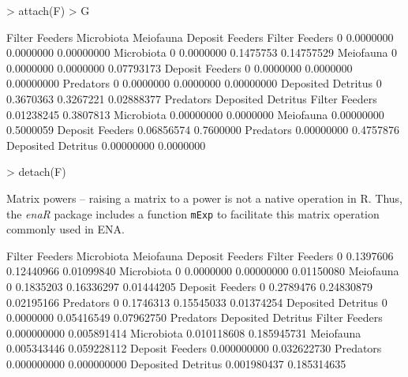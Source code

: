 \documentclass[article]{jss}
\begin{document}
\begin{Schunk}
\begin{Sinput}
> attach(F)
> G
\end{Sinput}
\begin{Soutput}
                   Filter Feeders Microbiota Meiofauna Deposit Feeders
Filter Feeders                  0  0.0000000 0.0000000      0.00000000
Microbiota                      0  0.0000000 0.1475753      0.14757529
Meiofauna                       0  0.0000000 0.0000000      0.07793173
Deposit Feeders                 0  0.0000000 0.0000000      0.00000000
Predators                       0  0.0000000 0.0000000      0.00000000
Deposited Detritus              0  0.3670363 0.3267221      0.02888377
                    Predators Deposited Detritus
Filter Feeders     0.01238245          0.3807813
Microbiota         0.00000000          0.0000000
Meiofauna          0.00000000          0.5000059
Deposit Feeders    0.06856574          0.7600000
Predators          0.00000000          0.4757876
Deposited Detritus 0.00000000          0.0000000
\end{Soutput}
\begin{Sinput}
> detach(F)
\end{Sinput}
\end{Schunk}

Matrix powers -- raising a matrix to a power is not a native operation
in R.  Thus, the \textit{enaR} package includes a function
\texttt{mExp} to facilitate this matrix operation commonly used in ENA.

\begin{Schunk}
\begin{Soutput}
                   Filter Feeders Microbiota  Meiofauna Deposit Feeders
Filter Feeders                  0  0.1397606 0.12440966      0.01099840
Microbiota                      0  0.0000000 0.00000000      0.01150080
Meiofauna                       0  0.1835203 0.16336297      0.01444205
Deposit Feeders                 0  0.2789476 0.24830879      0.02195166
Predators                       0  0.1746313 0.15545033      0.01374254
Deposited Detritus              0  0.0000000 0.05416549      0.07962750
                     Predators Deposited Detritus
Filter Feeders     0.000000000        0.005891414
Microbiota         0.010118608        0.185945731
Meiofauna          0.005343446        0.059228112
Deposit Feeders    0.000000000        0.032622730
Predators          0.000000000        0.000000000
Deposited Detritus 0.001980437        0.185314635
\end{Soutput}
\end{Schunk}
\end{document}

